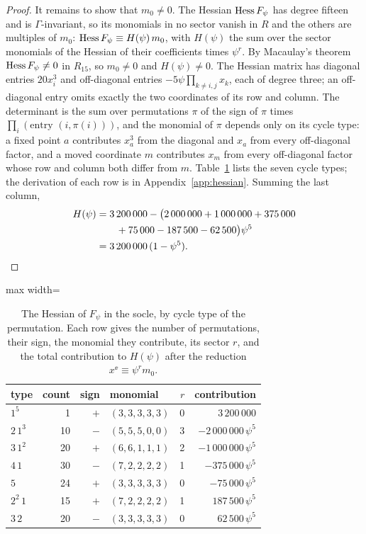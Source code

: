 \begin{proof}
It remains to show that $m_0\ne0$. The Hessian $\operatorname{Hess} F_\psi$ has degree
fifteen and is $\Gamma$-invariant, so its monomials in no sector vanish in
$R$ and the others are multiples of $m_0$:
$\operatorname{Hess} F_\psi\equiv H(\psi)\,m_0$, with $H(\psi)$ the sum over the sector
monomials of the Hessian of their coefficients times $\psi^r$. By
Macaulay's theorem $\operatorname{Hess} F_\psi\ne0$ in $R_{15}$, so $m_0\ne0$ and
$H(\psi)\ne0$. The Hessian matrix has diagonal entries $20x_i^3$ and
off-diagonal entries $-5\psi\prod_{k\ne i,j}x_k$, each of degree three; an
off-diagonal entry omits exactly the two coordinates of its row and column.
The determinant is the sum over permutations $\pi$ of the sign of $\pi$
times $\prod_i(\text{entry }(i,\pi(i)))$, and the monomial of $\pi$ depends
only on its cycle type: a fixed point $a$ contributes $x_a^3$ from the
diagonal and $x_a$ from every off-diagonal factor, and a moved coordinate
$m$ contributes $x_m$ from every off-diagonal factor whose row and column
both differ from $m$. Table~\ref{tab:hessian} lists the seven cycle types;
the derivation of each row is in Appendix~\ref{app:hessian}. Summing the
last column,
\begin{align*}
H(\psi)&=3\,200\,000-\big(2\,000\,000+1\,000\,000+375\,000\\
&\qquad+75\,000-187\,500-62\,500\big)\psi^5\\
&=3\,200\,000\,(1-\psi^5). \qedhere
\end{align*}
\end{proof}

\begin{table}[t]
\caption{The Hessian of $F_\psi$ in the socle, by cycle type of the
permutation. Each row gives the number of permutations, their sign, the
monomial they contribute, its sector $r$, and the total contribution to
$H(\psi)$ after the reduction $x^{\ee}\equiv\psi^rm_0$.}
\label{tab:hessian}
\centering
\begin{adjustbox}{max width=\linewidth}\begin{tabular}{lrrlrr}
\toprule
type & count & sign & monomial & $r$ & contribution\\
\midrule
$1^5$ & 1 & $+$ & $(3,3,3,3,3)$ & 0 & $3\,200\,000$\\
$2\,1^3$ & 10 & $-$ & $(5,5,5,0,0)$ & 3 & $-2\,000\,000\,\psi^5$\\
$3\,1^2$ & 20 & $+$ & $(6,6,1,1,1)$ & 2 & $-1\,000\,000\,\psi^5$\\
$4\,1$ & 30 & $-$ & $(7,2,2,2,2)$ & 1 & $-375\,000\,\psi^5$\\
$5$ & 24 & $+$ & $(3,3,3,3,3)$ & 0 & $-75\,000\,\psi^5$\\
$2^2\,1$ & 15 & $+$ & $(7,2,2,2,2)$ & 1 & $187\,500\,\psi^5$\\
$3\,2$ & 20 & $-$ & $(3,3,3,3,3)$ & 0 & $62\,500\,\psi^5$\\
\bottomrule
\end{tabular}\end{adjustbox}
\end{table}

